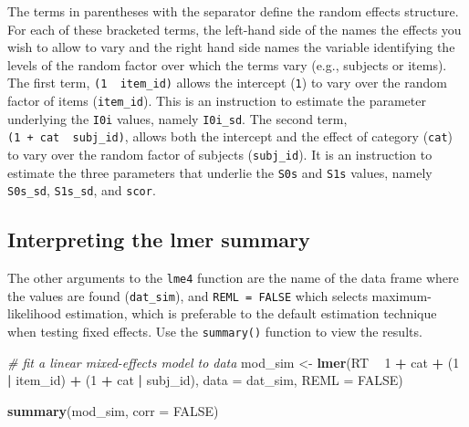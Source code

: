 \documentclass[doc,floatsintext]{apa6}
\newenvironment{Shaded}{\begin{snugshade}}{\end{snugshade}}
\newcommand{\KeywordTok}[1]{\textcolor[rgb]{0.13,0.29,0.53}{\textbf{#1}}}
\newcommand{\DataTypeTok}[1]{\textcolor[rgb]{0.13,0.29,0.53}{#1}}
\newcommand{\DecValTok}[1]{\textcolor[rgb]{0.00,0.00,0.81}{#1}}
\newcommand{\StringTok}[1]{\textcolor[rgb]{0.31,0.60,0.02}{#1}}
\newcommand{\CommentTok}[1]{\textcolor[rgb]{0.56,0.35,0.01}{\textit{#1}}}
\newcommand{\OtherTok}[1]{\textcolor[rgb]{0.56,0.35,0.01}{#1}}
\newcommand{\OperatorTok}[1]{\textcolor[rgb]{0.81,0.36,0.00}{\textbf{#1}}}
\newcommand{\NormalTok}[1]{#1}
\begin{document}
The terms in parentheses with the \texttt{\textbar{}} separator define
the random effects structure. For each of these bracketed terms, the
left-hand side of the \texttt{\textbar{}} names the effects you wish to
allow to vary and the right hand side names the variable identifying the
levels of the random factor over which the terms vary (e.g., subjects or
items). The first term, \texttt{(1\ \textbar{}\ item\_id)} allows the
intercept (\texttt{1}) to vary over the random factor of items
(\texttt{item\_id}). This is an instruction to estimate the parameter
underlying the \texttt{I0i} values, namely \texttt{I0i\_sd}. The second
term, \texttt{(1\ +\ cat\ \textbar{}\ subj\_id)}, allows both the
intercept and the effect of category (\texttt{cat}) to vary over the
random factor of subjects (\texttt{subj\_id}). It is an instruction to
estimate the three parameters that underlie the \texttt{S0s} and
\texttt{S1s} values, namely \texttt{S0s\_sd}, \texttt{S1s\_sd}, and
\texttt{scor}.

\subsection{Interpreting the lmer
summary}\label{interpreting-the-lmer-summary}

The other arguments to the \texttt{lme4} function are the name of the
data frame where the values are found (\texttt{dat\_sim}), and
\texttt{REML\ =\ FALSE} which selects maximum-likelihood estimation,
which is preferable to the default estimation technique when testing
fixed effects. Use the \texttt{summary()} function to view the results.

\begin{Shaded}
\begin{Highlighting}[]
\CommentTok{# fit a linear mixed-effects model to data}
\NormalTok{mod_sim <-}\StringTok{ }\KeywordTok{lmer}\NormalTok{(RT }\OperatorTok{~}\StringTok{ }\DecValTok{1} \OperatorTok{+}\StringTok{ }\NormalTok{cat }\OperatorTok{+}\StringTok{ }\NormalTok{(}\DecValTok{1} \OperatorTok{|}\StringTok{ }\NormalTok{item_id) }\OperatorTok{+}\StringTok{ }\NormalTok{(}\DecValTok{1} \OperatorTok{+}\StringTok{ }\NormalTok{cat }\OperatorTok{|}\StringTok{ }\NormalTok{subj_id),}
                \DataTypeTok{data =}\NormalTok{ dat_sim, }\DataTypeTok{REML =} \OtherTok{FALSE}\NormalTok{)}

\KeywordTok{summary}\NormalTok{(mod_sim, }\DataTypeTok{corr =} \OtherTok{FALSE}\NormalTok{)}
\end{Highlighting}
\end{Shaded}
\end{document}
